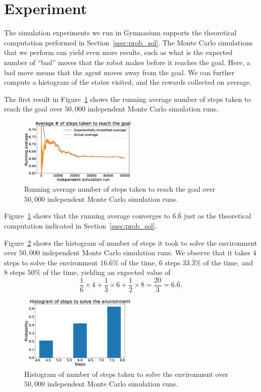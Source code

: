 \section{Experiment}
\label{sec:experiment}
%
The simulation experiments we run in Gymnasium supports the theoretical
computation performed in Section~\ref{ssec:prob_sol}. The Monte Carlo
simulations that we perform can yield even more results, such as what is the 
expected number of ``bad'' moves that the robot makes before it reaches the goal. Here, a bad move means that the agent moves away from the goal. We can 
further compute a histogram of the states visited, and the rewards collected on 
average.

The first result in Figure~\ref{fig:running_avg} shows the running average
number of steps taken to reach the goal over $50,000$ independent Monte Carlo
simulation runs.
%
\begin{figure}[t]
    \centering
    \includegraphics[width=0.5\textwidth]{./figures/running_avg.eps}
    \caption{Running average number of steps taken to reach the goal over $50,000$ independent Monte Carlo simulation runs.}
    \label{fig:running_avg}
\end{figure}
%
Figure~\ref{fig:running_avg} shows that the running average converges to $6.\bar{6}$ just as the theoretical computation indicated in Section~\ref{ssec:prob_sol}.

Figure~\ref{fig:histogram} shows the histogram of number of steps it took to 
solve the environment over $50,000$ independent Monte Carlo simulation runs. We 
observe that it takes $4$ steps to solve the environment $16.\bar{6}\%$ of the time, $6$ steps $33.\bar{3}\%$ of the time, and $8$ steps $50\%$ of the time, yielding an expected value of 
%
\[
\frac{1}{6} \times 4 + \frac{1}{3} \times 6 + \frac{1}{2} \times 8 = \frac{20}{3} = 6.\bar{6}.
\]
%
\begin{figure}[tbh]
    \centering
    \includegraphics[width=0.5\textwidth]{./figures/steps_histogram.eps}
    \caption{Histogram of number of steps taken to solve the environment over $50,000$ independent Monte Carlo simulation runs.}
    \label{fig:histogram}
\end{figure}

